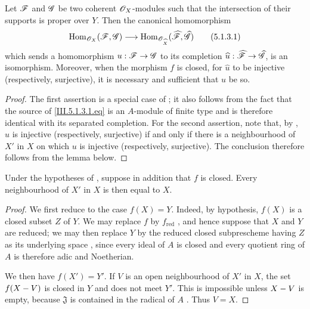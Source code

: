 \begin{corollary}[5.1.3]
\label{III.5.1.3}
Let $\mathscr{F}$ and $\mathscr{G}$ be two coherent $\mathscr{O}_X$-modules such that
the intersection of their supports is proper over $Y$.  Then the
canonical homomorphism
\[
  \operatorname{Hom}_{\mathscr{O}_X}(\mathscr{F},\mathscr{G})
  \longrightarrow
  \operatorname{Hom}_{\mathscr{O}_{\widehat{X}}}
  (\widehat{\mathscr{F}},\widehat{\mathscr{G}})
  \tag{5.1.3.1}
  \label{III.5.1.3.1.eq}
\]
which sends a homomorphism $u:\mathscr{F}\to\mathscr{G}$ to its completion
$\widehat{u}:\widehat{\mathscr{F}}\to\widehat{\mathscr{G}}$, is an
isomorphism.  Moreover, when the morphism $f$ is closed, for
$\widehat{u}$ to be injective (\textup{respectively,} surjective), it is
necessary and sufficient that $u$ be so.
\end{corollary}

\begin{proof}
The first assertion is a special case of ; it also
follows from the fact that the source of \eqref{III.5.1.3.1.eq} is
an $A$-module of finite type and is therefore identical with its
separated completion.  For the second assertion, note that, by
, $\widehat{u}$ is injective (respectively,
surjective) if and only if there is a neighbourhood of $X'$ in
$X$ on which $u$ is injective (respectively, surjective).  The
conclusion therefore follows from the lemma below.
\end{proof}


\begin{lemma}[5.1.3.1]
\label{III.5.1.3.1}
Under the hypotheses of , suppose in addition that
$f$ is closed.  Every neighbourhood of $X'$ in $X$ is then equal
to $X$.
\end{lemma}

\begin{proof}
We first reduce to the case $f(X)=Y$.  Indeed, by hypothesis,
$f(X)$ is a closed subset $Z$ of $Y$.  We may replace $f$ by
$f_{\mathrm{red}}$ , and hence suppose that $X$
and $Y$ are reduced; we may then replace $Y$ by the reduced closed
subprescheme having $Z$ as its underlying space
, since every ideal of $A$ is closed and every
quotient ring of $A$ is therefore adic and Noetherian.

We then have $f(X')=Y'$.  If $V$ is an open neighbourhood of $X'$
in $X$, the set $f(X- V)$ is closed in $Y$ and does not meet $Y'$.
This is impossible unless $X- V$ is empty, because $\mathfrak{J}$
is contained in the radical of $A$
 .  Thus $V=X$.
\end{proof}

